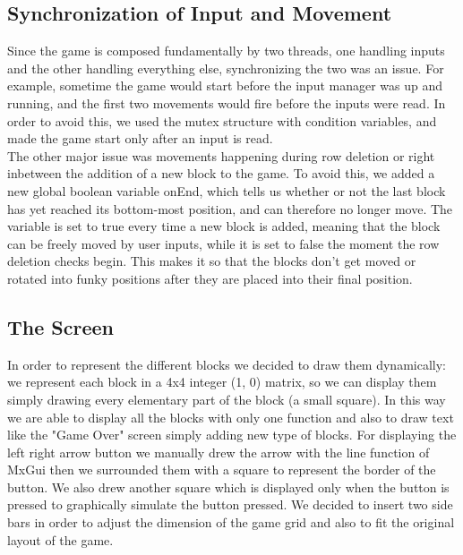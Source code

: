 	\subsection{Synchronization of Input and Movement}
		Since the game is composed fundamentally by two threads, one handling inputs and the other handling everything else, synchronizing the two was an issue. For example, sometime the game would start
		before the input manager was up and running, and the first two movements would fire before the inputs were read. In order to avoid this, we used the mutex structure with condition variables, and made
		the game start only after an input is read. \\
		The other major issue was movements happening during row deletion or right inbetween the addition of a new block to the game. To avoid this, we added a new global boolean variable onEnd, which tells us
		whether or not the last block has yet reached its bottom-most position, and can therefore no longer move. The variable is set to true every time a new block is added, meaning that the block can be freely
		moved by user inputs, while it is set to false the moment the row deletion checks begin. This makes it so that the blocks don't get moved or rotated into funky positions after they are placed into their 
		final position.
	\subsection{The Screen}
		In order to represent the different blocks we decided to draw them dynamically: we represent each block in a 4x4 integer (1, 0) matrix, so we can 
		display them simply drawing every elementary part of the block (a small square).
		In this way we are able to display all the blocks with only one function and also to draw text like the "Game Over" screen simply adding new type of blocks.
		For displaying the left right arrow button we manually drew the arrow with the line function of MxGui then we surrounded them with a square to represent the border of the button.
		We also drew another square which is displayed only when the button is pressed to graphically simulate the button pressed.
		We decided to insert two side bars in order to adjust the dimension of the game grid and also to fit the original layout of the game.
	